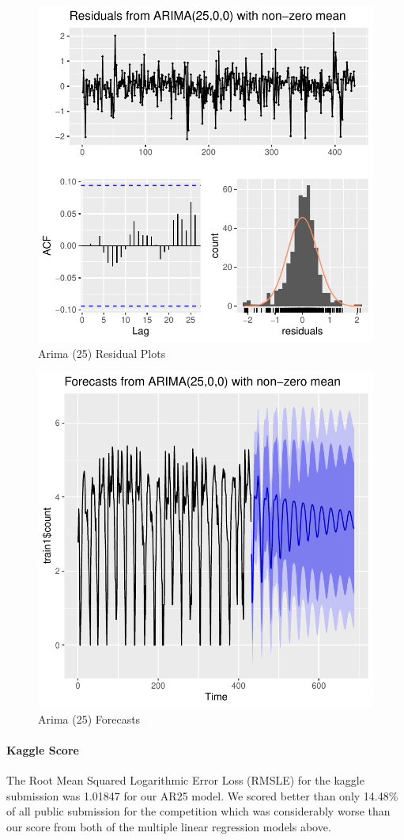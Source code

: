 \documentclass[american,]{article}
\let\oldparagraph\paragraph
\renewcommand{\paragraph}[1]{\oldparagraph{#1}\mbox{}}
\begin{document}
\begin{figure}[htbp]

{\centering \includegraphics[width=0.45\linewidth]{BikeSharingDemand_files/figure-latex/arima-25-plot-1-1} 

}

\caption{Arima (25) Residual Plots}\label{fig:arima-25-plot-1}
\end{figure}

\begin{figure}[htbp]

{\centering \includegraphics[width=0.45\linewidth]{BikeSharingDemand_files/figure-latex/arima-25-plot-2-1} 

}

\caption{Arima (25) Forecasts}\label{fig:arima-25-plot-2}
\end{figure}

\newpage

\hypertarget{kaggle-score-2}{%
\paragraph{Kaggle Score}\label{kaggle-score-2}}

The Root Mean Squared Logarithmic Error Loss (RMSLE) for the kaggle submission was 1.01847 for our AR25 model. We scored better than only 14.48\% of all public submission for the competition which was considerably worse than our score from both of the multiple linear regression models above.
\end{document}
